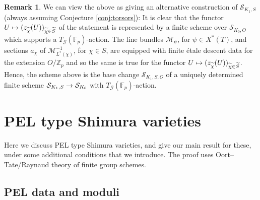 \documentclass[reqno, 10pt]{amsart}
\makeatletter
\newcommand{\BF}{\ensuremath{\mathbb {F}}\xspace}
\newcommand{\BZ}{\ensuremath{\mathbb {Z}}\xspace}
\newcommand{\CG}{\ensuremath{\mathcal {G}}\xspace}
\newcommand{\CM}{\ensuremath{\mathcal {M}}\xspace}
\newcommand{\CS}{\ensuremath{\mathcal {S}}\xspace}
\newcommand{\wt}{\widetilde}
\theoremstyle{definition}
\newtheorem{remark}[subsubsection]{Remark}
\numberwithin{equation}{subsection}
\numberwithin{subsubsection}{subsection}
\renewcommand{\to}{%
   \ifbool{@display}{\longrightarrow}{\rightarrow}%
   }
\let\shortmapsto\mapsto
\renewcommand{\mapsto}{%
   \ifbool{@display}{\shortmapsto}{\shortmapsto}%
   }
\makeatother
\begin{document}
 \begin{remark}\label{rem:alternative} We can view the above as giving an alternative construction of $\CS_{K_1, S}$
 (always assuming Conjecture  \ref{conj:torsors}):
 It is clear that the functor $U\mapsto (z_{\wt\chi}(U))_{\wt\chi\in \wt S}$ of the statement is represented by a finite scheme over $\CS_{K_0, O}$ which supports
a $T_\CG(\BF_p)$-action. The line bundles $\CM_\psi$, for $\psi\in X^*(T)$, and sections $a_\chi$ of $\CM^{-1}_{L^*(\chi)}$, for $\chi\in S$, are equipped with finite \'etale descent data for the extension $O/\BZ_p$ 
and so the same is true for the functor $U\mapsto (z_{\wt\chi}(U))_{\wt\chi\in \wt S}$. Hence, the scheme above is the base change $\CS_{K_1, S, O}$ of a uniquely determined finite scheme 
$
\CS_{K_1, S}\to \CS_{K_0}
$
 with $T_\CG(\BF_p)$-action.
 \end{remark}
 



 


\section{PEL type Shimura varieties}\label{s:PEL}

Here we discuss PEL type Shimura varieties, and give our main result for these, under some additional conditions that we introduce.
The proof uses Oort--Tate/Raynaud theory of finite group schemes.

\subsection{PEL data and moduli}\label{ss:PELdata}
\end{document}
